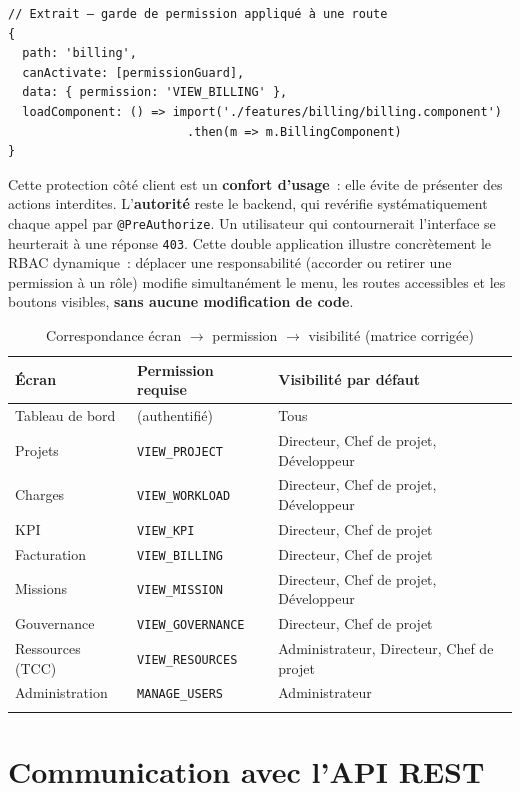 \begin{verbatim}
// Extrait — garde de permission appliqué à une route
{
  path: 'billing',
  canActivate: [permissionGuard],
  data: { permission: 'VIEW_BILLING' },
  loadComponent: () => import('./features/billing/billing.component')
                         .then(m => m.BillingComponent)
}
\end{verbatim}

\noindent Cette protection côté client est un \textbf{confort d'usage}~: elle évite de présenter des
actions interdites. L'\textbf{autorité} reste le backend, qui revérifie systématiquement chaque appel
par \texttt{@PreAuthorize}. Un utilisateur qui contournerait l'interface se heurterait à une réponse
\texttt{403}. Cette double application illustre concrètement le RBAC dynamique~: déplacer une
responsabilité (accorder ou retirer une permission à un rôle) modifie simultanément le menu, les
routes accessibles et les boutons visibles, \textbf{sans aucune modification de code}.

\begin{longtable}{|m{3.4cm}|m{4.2cm}|m{6.2cm}|}
\hline
\textbf{Écran} & \textbf{Permission requise} & \textbf{Visibilité par défaut} \\
\hline
\endhead
\endfoot
\endlastfoot
\hline
Tableau de bord & (authentifié) & Tous \\
\hline
Projets & \texttt{VIEW\_PROJECT} & Directeur, Chef de projet, Développeur \\
\hline
Charges & \texttt{VIEW\_WORKLOAD} & Directeur, Chef de projet, Développeur \\
\hline
KPI & \texttt{VIEW\_KPI} & Directeur, Chef de projet \\
\hline
Facturation & \texttt{VIEW\_BILLING} & Directeur, Chef de projet \\
\hline
Missions & \texttt{VIEW\_MISSION} & Directeur, Chef de projet, Développeur \\
\hline
Gouvernance & \texttt{VIEW\_GOVERNANCE} & Directeur, Chef de projet \\
\hline
Ressources (TCC) & \texttt{VIEW\_RESOURCES} & Administrateur, Directeur, Chef de projet \\
\hline
Administration & \texttt{MANAGE\_USERS} & Administrateur \\
\hline
\caption{Correspondance écran $\rightarrow$ permission $\rightarrow$ visibilité (matrice corrigée)}
\label{tab:front-rbac}
\end{longtable}

\section{Communication avec l'API REST}

